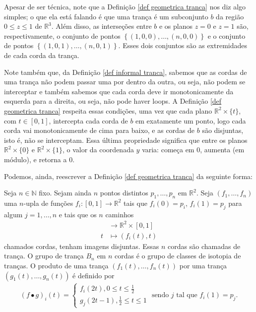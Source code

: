 	\begin{remark}
		Apesar de ser técnica, note que a Definição \ref{def geometrica tranca} nos diz algo simples; 
		o que ela está falando é que uma trança é um subconjunto $b$ da região $0\leq z\leq 1 $ 
		de $\mathbb{R}^3$. Além disso, as interseções entre $b$ e os planos $z = 0$ e $z = 1$ são, 
		respectivamente, o conjunto de pontos $\left\{  (1,0,0), \dots, (n,0,0)\right\}$ e o conjunto de 
		pontos $\left\{ (1,0,1), \dots, (n,0,1) \right\}$. Esses dois conjuntos são as extremidades de 
		cada corda da trança.
		
		\par\vspace{0.3cm} Note também que, da Definição \ref{def informal tranca}, sabemos que as 
		cordas de uma trança não podem passar uma por dentro da outra, ou seja, não podem se interceptar 
		e também sabemos que cada corda deve ir monotonicamente da esquerda para a direita, ou seja, não pode 
		haver loops. A Definição \ref{def geometrica tranca} respeita essas condições, uma vez que cada 
		plano $\mathbb{R}^2\times\{t\}$, com $t\in [0,1]$, intercepta cada corda de $b$ em exatamente um ponto,
		logo cada corda vai monotonicamente de cima para baixo, e as cordas de $b$ são disjuntas, isto é, 
		não se interceptam. Essa última propriedade significa que entre os planos $\mathbb{R}^2\times \{0\}$ 
		e $\mathbb{R}^2\times \{1\}$, o valor da coordenada $y$ varia: começa em $0$, aumenta (em módulo), 
		e retorna a $0$.
	\end{remark}
	Podemos, ainda, reescrever a Definição \ref{def geometrica tranca} da seguinte forma:
	\begin{definition}
	\label{outra def geometrica tranca}
		Seja $n\in\mathbb{N}$ fixo. Sejam ainda $n$ pontos distintos $p_1, \dots, p_n$ em $\mathbb{R}^2$. 
		Seja $(f_1, \dots, f_n)$ uma $n$-upla de funções $f_i:[0,1]\to\mathbb{R}^2$ tais que $f_i(0) = p_i$,
		$f_i(1) = p_j$ para algum $j=1,\dots,n$ e tais que os $n$ caminhos 
		\begin{align*}
    		[0,1]&\to\mathbb{R}^2\times[0,1] \\
    		t&\mapsto (f_i(t), t)
		\end{align*}
		chamados cordas, tenham imagens disjuntas. Essas $n$ cordas são chamadas de trança. 
		O grupo de trança $B_n$ em $n$ cordas é o grupo de classes de isotopia de tranças. O produto de uma 
		trança $( f_1(t), \dots, f_n(t) )$ por uma trança $( g_1(t), \dots, g_n(t) )$ é definido por
		\begin{align}
		\label{def prod trancas}
    		(f\bullet g)_i(t) = 
    		\begin{cases}
        		f_i(2t), 0\leq t\leq \displaystyle{\frac{1}{2}} \\
        		g_j(2t-1), \displaystyle{\frac{1}{2}}\leq t\leq 1
    		\end{cases}\text{ sendo } j \text{ tal que }f_i(1) = p_j.
		\end{align}
	\end{definition}
